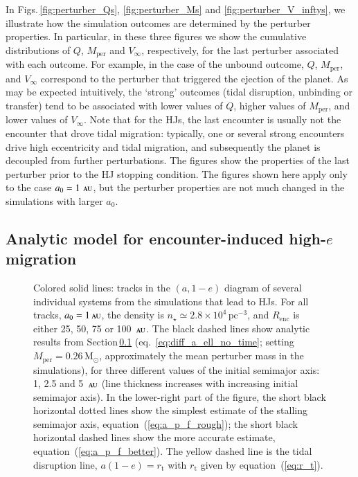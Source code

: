 \documentclass[iop,usenatbib]{emulateapj}
\renewcommand{\S}{Section}
\newcommand{\au}{\,\textsc{au}}
\newcommand{\renc}{R_\mathrm{enc}}
\newcommand{\mper}{M_\mathrm{per}}
\begin{document}
In Figs.\,\ref{fig:perturber_Qs}, \ref{fig:perturber_Ms} and \ref{fig:perturber_V_inftys}, we illustrate how the simulation outcomes are determined by the perturber properties. In particular, in these three figures we show the cumulative distributions of $Q$, $\mper$ and $V_\infty$, respectively, for the last perturber associated with each outcome. For example, in the case of the unbound outcome, $Q$, $\mper$, and $V_\infty$ correspond to the perturber that triggered the ejection of the planet. As may be expected intuitively, the `strong' outcomes (tidal disruption, unbinding or transfer) tend to be associated with lower values of $Q$, higher values of $\mper$, and lower values of $V_\infty$. Note that for the HJs, the last encounter is usually not the encounter that drove tidal migration: typically, one or several strong encounters drive high eccentricity and tidal migration, and subsequently the planet is decoupled from further perturbations. The figures show the properties of the last perturber prior to the HJ stopping condition. The figures shown here apply only to the case $a_0=1\,\au$, but the perturber properties are not much changed in the simulations with larger $a_0$. 


\subsection{Analytic model for encounter-induced high-$e$ migration}
\label{sect:pop_syn:an}

\begin{figure}
\center
\iftoggle{ApJFigs}{
\texttt{[image: a\_e\_plane\_run05\_ex.eps]}
}{
\texttt{[image: figs/a\_e\_plane\_run05\_ex.eps]}
}
\caption { Colored solid lines: tracks in the $(a,1-e)$ diagram of several individual systems from the simulations that lead to HJs. For all tracks, $a_0=1\au$, the density is $n_\star \simeq 2.8\times10^4 \, \mathrm{pc^{-3}}$, and $\renc$ is either 25, 50, 75 or 100 $\au$. The black dashed lines show analytic results from \S\,\ref{sect:pop_syn:an} (eq.~\ref{eq:diff_a_ell_no_time}; setting $\mper = 0.26 \, \mathrm{M}_\odot$, approximately the mean perturber mass in the simulations), for three different values of the initial semimajor axis: 1, 2.5 and 5 $\au$ (line thickness increases with increasing initial semimajor axis). In the lower-right part of the figure, the short black horizontal dotted lines show the simplest estimate of the stalling semimajor axis, equation~(\ref{eq:a_p_f_rough}); the short black horizontal dashed lines show the more accurate estimate, equation~(\ref{eq:a_p_f_better}). The yellow dashed line is the tidal disruption line, $a(1-e)=r_\mathrm{t}$ with $r_\mathrm{t}$ given by equation~(\ref{eq:r_t}). }
\label{fig:a_e_plane}
\end{figure}
\end{document}
